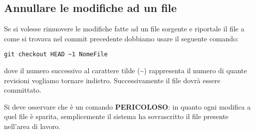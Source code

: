 \subsection{Annullare le modifiche ad un file}
Se si volesse rimuovere le modifiche fatte ad un file sorgente e riportale il file a come si trovava nel commit precedente dobbiamo usare il seguente comando:

\begin{center}
\texttt{git checkout HEAD \textasciitilde 1 NomeFile}

\end{center}

dove il numero successivo al carattere tilde (\textasciitilde) rappresenta il numero di quante revisioni vogliamo tornare indietro. Successivamente il file dovrà essere committato.

Si deve osservare che è un comando \textbf{PERICOLOSO}: in quanto ogni modifica a quel file è sparita, semplicemente il sistema ha sovrascritto il file presente nell'area di lavoro.